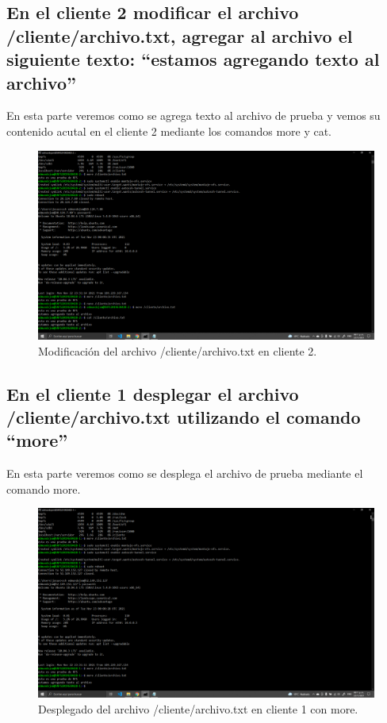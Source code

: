 \documentclass[11pt]{article}
\begin{document}
		\subsection{En el cliente 2 modificar el archivo /cliente/archivo.txt, agregar al archivo el siguiente texto: ``estamos agregando texto al archivo''}
		En esta parte veremos como se agrega texto al archivo de prueba y vemos su contenido acutal en el cliente 2 mediante los comandos more y cat.
		\begin{figure}[H]
			\centering
			\includegraphics[scale=0.34]{resources/p12.png}
			\caption{Modificación del archivo /cliente/archivo.txt en cliente 2.}\label{fig:picture}
		\end{figure}
		\subsection{En el cliente 1 desplegar el archivo /cliente/archivo.txt utilizando el comando ``more''}
		En esta parte veremos como se desplega el archivo de prueba mediante el comando more.
		\begin{figure}[H]
			\centering
			\includegraphics[scale=0.34]{resources/p13.png}
			\caption{Desplegado del archivo /cliente/archivo.txt en cliente 1 con more.}\label{fig:picture}
		\end{figure}
\end{document}
